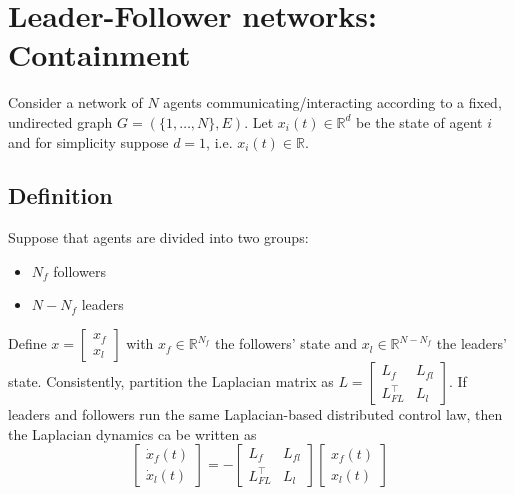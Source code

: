 \documentclass{book}
\newcommand{\R}{\mathbb{R}}
\theoremstyle{theoremv2}
\theoremstyle{defv2}
\theoremstyle{remark}
\theoremstyle{remark}
\theoremstyle{definition}
\theoremstyle{definition}
\begin{document}
\chapter{Leader-Follower networks: Containment}
Consider a network of $N$ agents communicating/interacting according to a fixed, undirected graph $G=(\{1,\dots,N\},E)$. Let $x_i(t)\in\R^d$ be the state of agent $i$ and for simplicity suppose $d=1$, i.e. $x_i(t)\in\R$.

\section{Definition}
Suppose that agents are divided into two groups: 
\begin{itemize}
    \item $N_f$ followers
    \item $N-N_f$ leaders
\end{itemize}
Define $x = \begin{bmatrix}
    x_f \\ x_l
\end{bmatrix}$ with $x_f\in\R^{N_f}$ the followers' state and $x_l\in\R^{N-N_f}$ the leaders' state.
Consistently, partition the Laplacian matrix as $L = \begin{bmatrix}
    L_f & L_{fl} \\ L_{FL}^\top & L_l
\end{bmatrix}$.
If leaders and followers run the same Laplacian-based distributed control law, then the Laplacian dynamics ca be written as 
\[
    \begin{bmatrix}
        \dot{x}_f(t) \\ \dot{x}_l(t) 
    \end{bmatrix} = -\begin{bmatrix}
        L_f & L_{fl} \\ L_{FL}^\top & L_l
    \end{bmatrix} \begin{bmatrix}
        x_f(t) \\ x_l(t)
    \end{bmatrix}
\]
\end{document}
